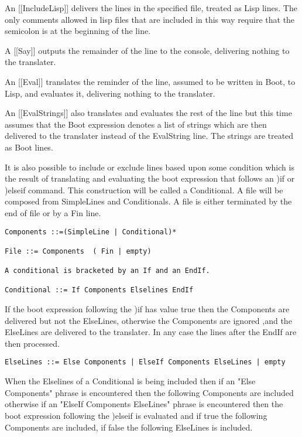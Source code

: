 \documentclass{article}
\begin{document}
An [[IncludeLisp]] delivers the lines in the specified file, treated as Lisp
lines. The only comments allowed in lisp files that are included in
this way require that the semicolon is at the beginning of the line.
 
A [[Say]] outputs the remainder of the line to the console,
   delivering nothing to the translater.
 
An [[Eval]] translates the reminder of the line, assumed to be
   written in Boot, to Lisp, and evaluates it, delivering nothing to
   the translater.
 
An [[EvalStrings]] also translates and evaluates the rest of the line
   but this time assumes that the Boot expression denotes a list
   of strings which are then delivered to the translater
   instead of the EvalString line. The strings are treated as Boot lines.
 
It is also possible to include or exclude lines based upon some
condition which is the result of translating and evaluating
the boot expression that follows an )if or )elseif command.
This construction will be called a Conditional. A file will be
composed from SimpleLines and Conditionals. A file is either
terminated by the end of file or by a Fin line.
\begin{verbatim}  
Components ::=(SimpleLine | Conditional)*
 
File ::= Components  ( Fin | empty)
 
A conditional is bracketed by an If and an EndIf.
 
Conditional ::= If Components Elselines EndIf
\end{verbatim} 

If the boot expression following the )if has value true then the
Components are delivered but not the ElseLines,
otherwise the Components are ignored ,and the ElseLines
are delivered to the translater. In any case the lines after
the EndIf are then processed.
\begin{verbatim}  
ElseLines ::= Else Components | ElseIf Components ElseLines | empty
\end{verbatim} 

When the Elselines of a Conditional is being included then if an
"Else Components" phrase is encountered then the following
Components are included
otherwise if an "ElseIf Components ElseLines" phrase is encountered then
the boot expression following the )elseif is evaluated and
if true the following Components are included, if false the
following ElseLines is included.
 
\end{document}
